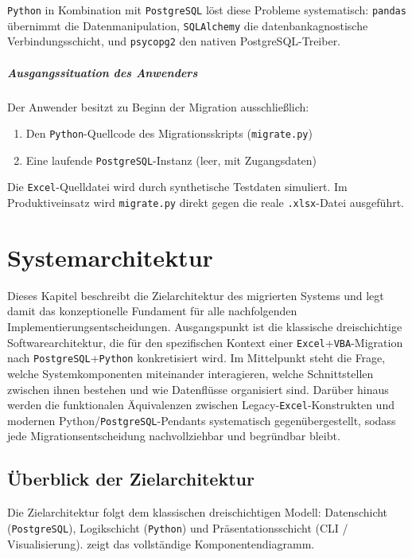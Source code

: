 \documentclass[12pt,a4paper]{report}
\theoremstyle{definition}
\theoremstyle{remark}
\newcommand{\excel}{\texttt{Excel}}
\newcommand{\vba}{\texttt{VBA}}
\newcommand{\pg}{\texttt{PostgreSQL}}
\newcommand{\py}{\texttt{Python}}
\newcommand{\pandas}{\texttt{pandas}}
\newcommand{\sqlalchemy}{\texttt{SQLAlchemy}}
\newcommand{\psycopg}{\texttt{psycopg2}}
\newcommand{\code}[1]{\texttt{#1}}
\begin{document}
\py{} in Kombination mit \pg{} l\"ost diese Probleme systematisch: \pandas{}
übernimmt die Datenmanipulation, \sqlalchemy{} die datenbankagnostische
Verbindungsschicht, und \psycopg{} den nativen PostgreSQL-Treiber.

\paragraph{Ausgangssituation des Anwenders}
Der Anwender besitzt zu Beginn der Migration ausschlie\ss{}lich:
\begin{enumerate}[leftmargin=1.5em, topsep=2pt]
  \item Den \py-Quellcode des Migrationsskripts (\code{migrate.py})
  \item Eine laufende \pg-Instanz (leer, mit Zugangsdaten)
\end{enumerate}
Die \excel-Quelldatei wird durch synthetische Testdaten simuliert.
Im Produktiveinsatz wird \code{migrate.py} direkt gegen die reale
\code{.xlsx}-Datei ausgeführt.

\chapter{Systemarchitektur}

Dieses Kapitel beschreibt die Zielarchitektur des migrierten Systems und legt damit das konzeptionelle Fundament für alle nachfolgenden Implementierungsentscheidungen. Ausgangspunkt ist die klassische dreischichtige Softwarearchitektur, die für den spezifischen Kontext einer \excel{}+\vba{}-Migration nach \pg{}+\py{} konkretisiert wird. Im Mittelpunkt steht die Frage, welche Systemkomponenten miteinander interagieren, welche Schnittstellen zwischen ihnen bestehen und wie Datenflüsse organisiert sind. Darüber hinaus werden die funktionalen Äquivalenzen zwischen Legacy-\excel-Konstrukten und modernen Python/\pg{}-Pendants systematisch gegenübergestellt, sodass jede Migrationsentscheidung nachvollziehbar und begründbar bleibt.

\section{Überblick der Zielarchitektur}
Die Zielarchitektur folgt dem klassischen dreischichtigen Modell:
Datenschicht (\pg), Logikschicht (\py) und Präsentationsschicht
(CLI / Visualisierung).  zeigt das vollständige
Komponentendiagramm.
\end{document}
